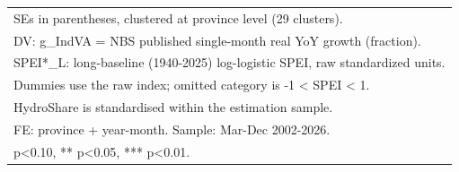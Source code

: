 {\begin{tabular}{l*{6}{c}}
\bottomrule
\multicolumn{7}{l}{\footnotesize SEs in parentheses, clustered at province level (29 clusters).}\\
\multicolumn{7}{l}{\footnotesize DV: g\_IndVA = NBS published single-month real YoY growth (fraction).}\\
\multicolumn{7}{l}{\footnotesize SPEI*\_L: long-baseline (1940-2025) log-logistic SPEI, raw standardized units.}\\
\multicolumn{7}{l}{\footnotesize Dummies use the raw index; omitted category is -1 < SPEI < 1.}\\
\multicolumn{7}{l}{\footnotesize HydroShare is standardised within the estimation sample.}\\
\multicolumn{7}{l}{\footnotesize FE: province + year-month. Sample: Mar-Dec 2002-2026.}\\
\multicolumn{7}{l}{\footnotesize * p<0.10, ** p<0.05, *** p<0.01.}\\
\end{tabular}
}
